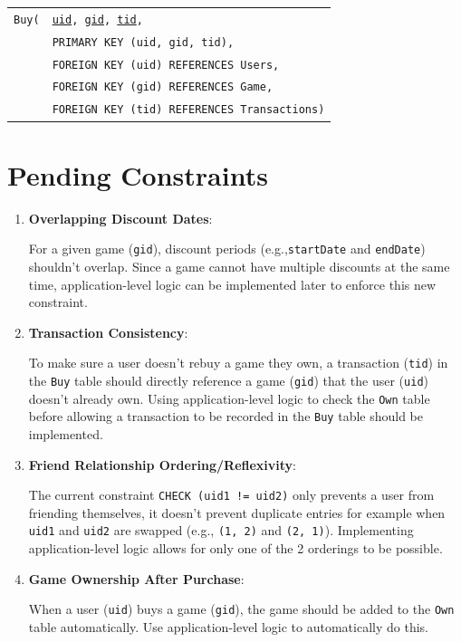 \documentclass[12pt, oneside]{article}
\begin{document}
\begin{tabular}{l@{}l}
    \texttt{Buy(} & \texttt{\underline{uid}, \underline{gid}, \underline{tid},}\\
                   & \texttt{PRIMARY KEY (uid, gid, tid),}\\
                   & \texttt{FOREIGN KEY (uid) REFERENCES Users,}\\
                   & \texttt{FOREIGN KEY (gid) REFERENCES Game,}\\
                   & \texttt{FOREIGN KEY (tid) REFERENCES Transactions)}
\end{tabular}
\section{Pending Constraints}

\begin{enumerate}
    \item \textbf{Overlapping Discount Dates}: 
    
        For a given game (\texttt{gid}), discount periods (e.g.,\texttt{startDate} and \texttt{endDate}) shouldn't overlap. Since a game cannot have multiple discounts at the same time, application-level logic can be implemented later to enforce this new constraint.
    
    \item \textbf{Transaction Consistency}:
    
         To make sure a user doesn't rebuy a game they own, a transaction (\texttt{tid}) in the \texttt{Buy} table should directly reference a game (\texttt{gid}) that the user (\texttt{uid}) doesn't already own. Using application-level logic to check the \texttt{Own} table before allowing a transaction to be recorded in the \texttt{Buy} table should be implemented. 
        
    \item \textbf{Friend Relationship Ordering/Reflexivity}:
    
        The current constraint \texttt{CHECK (uid1 != uid2)} only prevents a user from friending themselves, it doesn't prevent duplicate entries for example when \texttt{uid1} and \texttt{uid2} are swapped (e.g., \texttt{(1, 2)} and \texttt{(2, 1)}). Implementing application-level logic allows for only one of the 2 orderings to be possible.
    
    \item \textbf{Game Ownership After Purchase}:

        When a user (\texttt{uid}) buys a game (\texttt{gid}), the game should be added to the \texttt{Own} table automatically. Use application-level logic to automatically do this.  
\end{enumerate}
\end{document}
